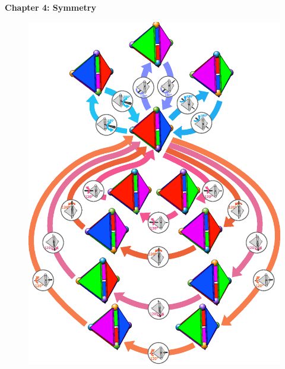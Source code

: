 \renewcommand{\theequation}{4.\arabic{equation}}

\begin{frame}
\begin{center}
{\bf Chapter 4: Symmetry}\\
\end{center}

\begin{figure}
\centering
\includegraphics[scale=0.22]{figs/intro4}
\end{figure}
\end{frame}

\scriptsize










